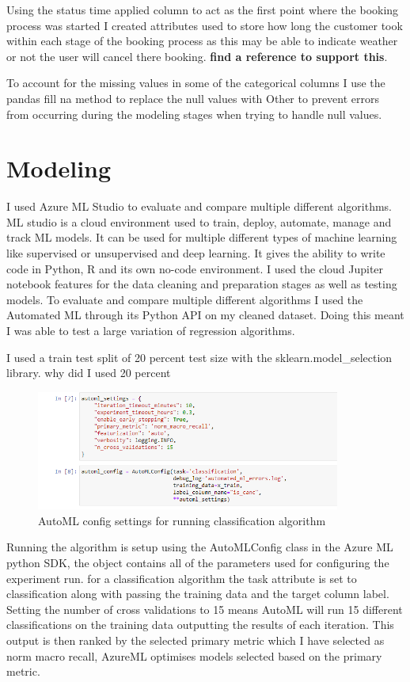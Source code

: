 Using the status time applied column to act as the first point where the booking process was started I created attributes used to store how long the customer took within each stage of the booking process as this may be able to indicate weather or not the user will cancel there booking.  \textbf{find a reference to support this}.

To account for the missing values in some of the categorical columns I use the pandas fill na method to replace the null values with Other  to prevent errors from occurring during the modeling stages when trying to handle null values.

\section{Modeling}

I used Azure ML Studio to evaluate and compare multiple different algorithms. ML studio is a cloud environment used to train, deploy, automate, manage and track ML models. It can be used for multiple different types of machine learning like supervised or unsupervised and deep learning. It gives the ability to write code in Python, R and its own no-code environment.  I used the cloud Jupiter notebook features for the data cleaning and preparation stages as well as testing models. To evaluate and compare multiple different algorithms I used the Automated ML through its Python API on my cleaned dataset. Doing this meant I was able to test a large variation of regression algorithms.

I used a train test split of 20 percent test size with the sklearn.model_selection library. why did I used 20 percent

\begin{figure}[hbt!]
 \includegraphics[width=10cm]{figures/auto_ml_settings.png}
 \caption{AutoML config settings for running classification algorithm}
\end{figure}

Running the algorithm is setup using the AutoMLConfig class in the Azure ML python SDK, the object contains all of the parameters used for configuring the experiment run. for a classification algorithm the task attribute is set to classification along with passing the training data and the target column label. Setting the number of cross validations to 15 means AutoML will run 15 different classifications on the training data outputting the results of each iteration. This output is then ranked by the selected primary metric which I have selected as norm macro recall, AzureML optimises models selected based on the primary metric. 

